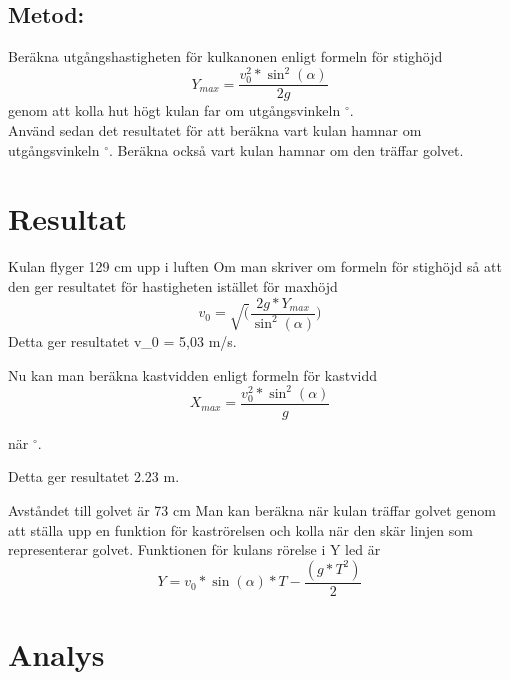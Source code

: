 \documentclass[11p]{article}
\begin{document}
    \subsection{Metod:}
    Beräkna utgångshastigheten för kulkanonen enligt formeln för stighöjd
    \begin{equation}
        Y_{max} = \frac{v_0^2*\sin^2(\alpha)}{2g}
    \end{equation}
    genom att kolla hut högt kulan far om utgångsvinkeln \alpha {} $^{\circ}$. \\
    Använd sedan det resultatet för att beräkna vart kulan hamnar om utgångsvinkeln \alpha {} $^{\circ}$.
    Beräkna också vart kulan hamnar om den träffar golvet.
    \paragraph{}

    \section{Resultat}
    Kulan flyger 129 cm upp i luften
    Om man skriver om formeln för stighöjd så att den ger resultatet för hastigheten istället för maxhöjd
    \begin{equation}
       v_0 = \sqrt(\frac{2g*Y_{max}}{\sin^2(\alpha)})
    \end{equation}
    Detta ger resultatet {v_0} = 5,03 m/s.

    Nu kan man beräkna kastvidden enligt formeln för kastvidd
    \begin{equation}
        X_{max} = \frac{v_0^2*\sin^2(\alpha)}{g}
    \end{equation}

    när \alpha {} $^{\circ}$.

    Detta ger resultatet 2.23 m.

    Avståndet till golvet är 73 cm
    Man kan beräkna när kulan träffar golvet genom att ställa upp en funktion för kaströrelsen och kolla när den skär linjen som representerar golvet.
    Funktionen för kulans rörelse i Y led är
    \begin{equation}
        Y = v_0*\sin(\alpha) * T - \frac{(g*T^2)}{2}
    \end{equation}


    \section{Analys}
\end{document}
